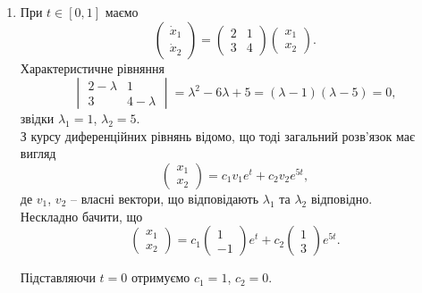 \begin{solution}
	\begin{enumerate}
		\item При $t \in [0, 1]$ маємо 
		\[
			\begin{pmatrix}
				\dot x_1 \\ 
				\dot x_2
			\end{pmatrix}
			=
			\begin{pmatrix}
				2 & 1 \\
				3 & 4
			\end{pmatrix}
			\begin{pmatrix}
				x_1 \\
				x_2
			\end{pmatrix}.
		\]
		Характеристичне рівняння 
		\[
			\begin{vmatrix}
				2 - \lambda & 1 \\
				3 & 4 - \lambda 
			\end{vmatrix}
			=
			\lambda^2 - 6\lambda + 5 
			=
			(\lambda - 1) (\lambda - 5)
			=
			0,
		\]
		звідки $\lambda_1 = 1$, $\lambda_2 = 5$.\\
		
		З курсу диференційних рівнянь відомо, що тоді загальний розв'язок має вигляд
		\[
			\begin{pmatrix}
			x_1 \\
			x_2
			\end{pmatrix}
			=
			c_1 v_1 e^t + c_2 v_2 e^{5t},
		\]
		де $v_1$, $v_2$ -- власні вектори, що відповідають $\lambda_1$ та $\lambda_2$ відповідно.\\
		
		Нескладно бачити, що 
		\[
			\begin{pmatrix}
				x_1 \\
				x_2
			\end{pmatrix}
			=
			c_1 
			\begin{pmatrix}
				1 \\
				-1
			\end{pmatrix} 
			e^t 
			+ 
			c_2 
			\begin{pmatrix}
				1 \\
				3
			\end{pmatrix} 
			e^{5t}.
		\]
		
		Підставляючи $t = 0$ отримуємо $c_1 = 1$, $c_2 = 0$.
		

\end{enumerate}
\end{solution}
